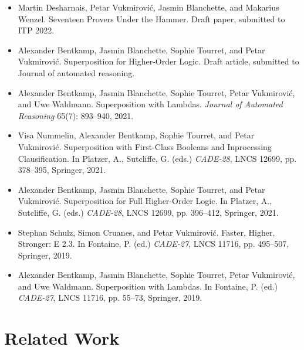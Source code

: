 \begin{itemize}
  \item Martin Desharnais, Petar Vukmirović, Jasmin Blanchette, and Makarius Wenzel. Seventeen Provers Under the Hammer.
  Draft paper, submitted to ITP 2022.
  \item Alexander Bentkamp, Jasmin Blanchette, Sophie Tourret, and Petar Vukmirović. Superposition for Higher-Order Logic.
  Draft article, submitted to Journal of automated reasoning.
  \item Alexander Bentkamp, Jasmin Blanchette, Sophie Tourret, Petar Vukmirović, and Uwe Waldmann.  Superposition with Lambdas.
  \emph{Journal of Automated Reasoning} 65(7): 893--940, 2021. 
  \item Visa Nummelin, Alexander Bentkamp, Sophie Tourret, and Petar Vukmirović. Superposition with First-Class Booleans and Inprocessing Clausification.
  In Platzer, A., Sutcliffe, G. (eds.) \emph{CADE-28}, LNCS 12699, pp. 378--395, Springer, 2021.
  \item Alexander Bentkamp, Jasmin Blanchette, Sophie Tourret, and Petar Vukmirović. Superposition for Full Higher-Order Logic.
  In Platzer, A., Sutcliffe, G. (eds.) \emph{CADE-28}, LNCS 12699, pp. 396--412, Springer, 2021.
  \item Stephan Schulz, Simon Cruanes, and Petar Vukmirović. Faster, Higher, Stronger: E 2.3.
  In Fontaine, P. (ed.) \emph{CADE-27},  LNCS 11716, pp. 495--507, Springer, 2019.
  \item Alexander Bentkamp, Jasmin Blanchette, Sophie Tourret, Petar Vukmirović, and Uwe Waldmann.  Superposition with Lambdas.
  In Fontaine, P. (ed.) \emph{CADE-27}, LNCS 11716, pp. 55--73, Springer, 2019. 
\end{itemize}

\section{Related Work}
